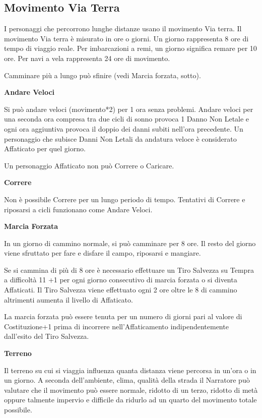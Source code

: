 \begin{multicols}{2}
\subsection{Movimento Via Terra}\label{movimentoviaterra}

I personaggi che percorrono lunghe distanze usano il movimento Via terra. Il movimento Via terra è misurato in ore o giorni. Un giorno rappresenta 8 ore di tempo di viaggio reale. Per imbarcazioni a remi, un giorno significa remare per 10 ore. Per navi a vela rappresenta 24 ore di movimento.

Camminare più a lungo può sfinire (vedi Marcia forzata, sotto).

\textbf{Andare Veloci}\label{andareveloci}

Si può andare veloci (movimento*2) per 1 ora senza problemi. Andare veloci per una seconda ora compresa tra due cicli di sonno provoca 1 Danno Non Letale e ogni ora aggiuntiva provoca il doppio dei danni subiti nell'ora precedente. Un personaggio che subisce Danni Non Letali da andatura veloce è considerato Affaticato per quel giorno.

Un personaggio Affaticato non può Correre o Caricare.

\textbf{Correre}\label{correre}

Non è possibile Correre per un lungo periodo di tempo. Tentativi di Correre e riposarsi a cicli funzionano come Andare Veloci.

\textbf{Marcia Forzata}\label{marciaforzata}

In un giorno di cammino normale, si può camminare per 8 ore. Il resto del giorno viene sfruttato per fare e disfare il campo, riposarsi e mangiare.

Se si cammina di più di 8 ore è necessario effettuare un Tiro Salvezza su Tempra a difficoltà 11 +1 per ogni giorno consecutivo di marcia forzata o si diventa Affaticati. Il Tiro Salvezza viene effettuato ogni 2 ore oltre le 8 di cammino altrimenti aumenta il livello di Affaticato.

La marcia forzata può essere tenuta per un numero di giorni pari al valore di Costituzione+1 prima di incorrere nell'Affaticamento indipendentemente dall'esito del Tiro Salvezza.

\textbf{Terreno}\label{terreno}

Il terreno su cui si viaggia influenza quanta distanza viene percorsa in un'ora o in un giorno. A seconda dell'ambiente, clima, qualità della strada il Narratore può valutare che il movimento può essere normale, ridotto di un terzo, ridotto di metà oppure talmente impervio e difficile da ridurlo ad un quarto del movimento totale possibile.


\end{multicols}
